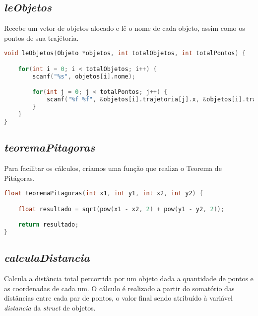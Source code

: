 \documentclass{article}
\begin{document}

\subsection{\textit{leObjetos}}

\hspace*{\parindent}Recebe um vetor de objetos alocado e lê o nome de cada objeto, assim como os pontos de sua trajétoria.

\begin{lstlisting}[label={lst:cod1},language=C]
void leObjetos(Objeto *objetos, int totalObjetos, int totalPontos) {

    for(int i = 0; i < totalObjetos; i++) {
        scanf("%s", objetos[i].nome);

        for(int j = 0; j < totalPontos; j++) {
            scanf("%f %f", &objetos[i].trajetoria[j].x, &objetos[i].trajetoria[j].y);
        }
    }
}
\end{lstlisting}

\clearpage


\subsection{\textit{teoremaPitagoras}}

\hspace*{\parindent}Para facilitar os cálculos, criamos uma função que realiza o Teorema de Pitágoras.

\begin{lstlisting}[label={lst:cod1},language=C]
float teoremaPitagoras(int x1, int y1, int x2, int y2) {

    float resultado = sqrt(pow(x1 - x2, 2) + pow(y1 - y2, 2));

    return resultado;
}
\end{lstlisting}


\subsection{\textit{calculaDistancia}}

\hspace*{\parindent}Calcula a distância total percorrida por um objeto dada a quantidade de pontos e as coordenadas de cada um. O cálculo é realizado a partir do somatório das distâncias entre cada par de pontos, o valor final sendo atribuído à variável \textit{distancia} da \textit{struct} de objetos.
\end{document}
